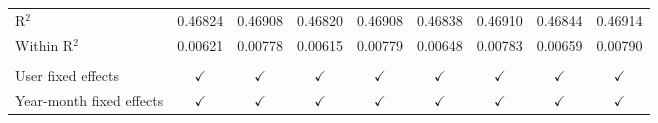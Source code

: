 \begin{tabular}{lcccccccc}
   R$^2$                                  & 0.46824        & 0.46908         & 0.46820          & 0.46908         & 0.46838        & 0.46910         & 0.46844          & 0.46914\\  
   Within R$^2$                           & 0.00621        & 0.00778         & 0.00615          & 0.00779         & 0.00648        & 0.00783         & 0.00659          & 0.00790\\  
    \\
   User fixed effects                     & $\checkmark$   & $\checkmark$    & $\checkmark$     & $\checkmark$    & $\checkmark$   & $\checkmark$    & $\checkmark$     & $\checkmark$\\   
   Year-month fixed effects               & $\checkmark$   & $\checkmark$    & $\checkmark$     & $\checkmark$    & $\checkmark$   & $\checkmark$    & $\checkmark$     & $\checkmark$\\   
   \bottomrule
\end{tabular}
\par\endgroup


